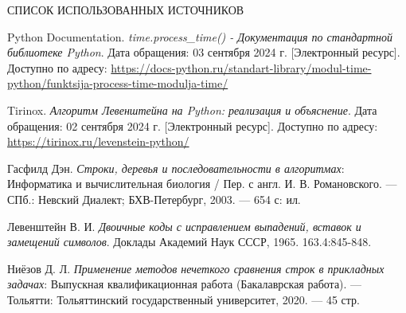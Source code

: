 \begin{center}
    \MakeUppercase{\large Список использованных источников}
\end{center}

\renewcommand{\refname}{}
\vspace{-11mm}

\begin{thebibliography}{9}
     Python Documentation. \textit{time.process\_time() - Документация по стандартной библиотеке Python}. Дата обращения: 03 сентября 2024 г. [Электронный ресурс]. Доступно по адресу: \url{https://docs-python.ru/standart-library/modul-time-python/funktsija-process-time-modulja-time/}
    
     Tirinox. \textit{Алгоритм Левенштейна на Python: реализация и объяснение}. Дата обращения: 02 сентября 2024 г. [Электронный ресурс]. Доступно по адресу: \url{https://tirinox.ru/levenstein-python/}
    
     Гасфилд Дэн. \textit{Строки, деревья и последовательности в алгоритмах}: Информатика и вычислительная биология / Пер. с англ. И. В. Романовского. — СПб.: Невский Диалект; БХВ-Петербург, 2003. — 654 с: ил.
    
     Левенштейн В. И. \textit{Двоичные коды с исправлением выпадений, вставок и замещений символов}. Доклады Академий Наук СССР, 1965. 163.4:845-848.
    
     Ниёзов Д. Л. \textit{Применение методов нечеткого сравнения строк в прикладных задачах}: Выпускная квалификационная работа (Бакалаврская работа). — Тольятти: Тольяттинский государственный университет, 2020. — 45 стр.
    
\end{thebibliography}